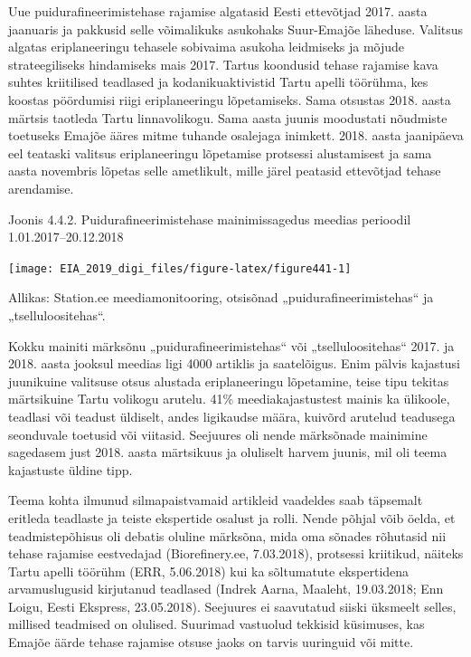 \documentclass[estonian,]{article}
\begin{document}
\begin{casebox}
Uue puidurafineerimistehase rajamise algatasid Eesti ettevõtjad 2017.
aasta jaanuaris ja pakkusid selle võimalikuks asukohaks Suur-Emajõe
läheduse. Valitsus algatas eriplaneeringu tehasele sobivaima asukoha
leidmiseks ja mõjude strateegiliseks hindamiseks mais 2017. Tartus
koondusid tehase rajamise kava suhtes kriitilised teadlased ja
kodanikuaktivistid Tartu apelli töörühma, kes koostas pöördumisi riigi
eriplaneeringu lõpetamiseks. Sama otsustas 2018. aasta märtsis taotleda
Tartu linnavolikogu. Sama aasta juunis moodustati nõudmiste toetuseks
Emajõe ääres mitme tuhande osalejaga inimkett. 2018. aasta jaanipäeva
eel teataski valitsus eriplaneeringu lõpetamise protsessi alustamisest
ja sama aasta novembris lõpetas selle ametlikult, mille järel peatasid
ettevõtjad tehase arendamise.
\end{casebox}

{Joonis 4.4.2.} Puidurafineerimistehase mainimissagedus meedias perioodil 1.01.2017--20.12.2018

\begin{center}\texttt{[image: EIA\_2019\_digi\_files/figure-latex/figure441-1]} \end{center}

\begin{imgsource}
{Allikas:} Station.ee meediamonitooring, otsisõnad
„puidurafineerimistehas`` ja „tselluloositehas``.
\end{imgsource}

Kokku mainiti märksõnu „puidurafineerimistehas`` või „tselluloositehas`` 2017. ja 2018. aasta jooksul meedias ligi 4000 artiklis ja saatelõigus. Enim pälvis kajastusi juunikuine valitsuse otsus alustada eriplaneeringu lõpetamine, teise tipu tekitas märtsikuine Tartu volikogu arutelu. 41\% meediakajastustest mainis ka ülikoole, teadlasi või teadust üldiselt, andes ligikaudse määra, kuivõrd arutelud teadusega seonduvale toetusid või viitasid. Seejuures oli nende märksõnade mainimine sagedasem just 2018. aasta märtsikuus ja oluliselt harvem juunis, mil oli teema kajastuste üldine tipp.

Teema kohta ilmunud silmapaistvamaid artikleid vaadeldes saab täpsemalt eritleda teadlaste ja teiste ekspertide osalust ja rolli. Nende põhjal võib öelda, et teadmistepõhisus oli debatis oluline märksõna, mida oma sõnades rõhutasid nii tehase rajamise eestvedajad (Biorefinery.ee, 7.03.2018), protsessi kriitikud, näiteks Tartu apelli töörühm (ERR, 5.06.2018) kui ka sõltumatute ekspertidena arvamuslugusid kirjutanud teadlased (Indrek Aarna, Maaleht, 19.03.2018; Enn Loigu, Eesti Ekspress, 23.05.2018). Seejuures ei saavutatud siiski üksmeelt selles, millised teadmised on olulised. Suurimad vastuolud tekkisid küsimuses, kas Emajõe äärde tehase rajamise otsuse jaoks on tarvis uuringuid või mitte.
\end{document}
